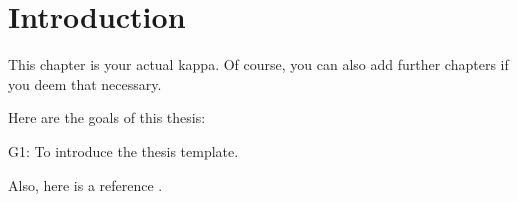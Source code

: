 \chapter{Introduction}
\label{chap_Introduction}
This chapter is your actual kappa.
%
Of course, you can also add further chapters if you deem that necessary.

Here are the goals of this thesis:
\begin{LaTeXdescription}
 \item[G1:] To introduce the thesis template.
\end{LaTeXdescription}

Also, here is a reference \cite{liebel16sosym}.
